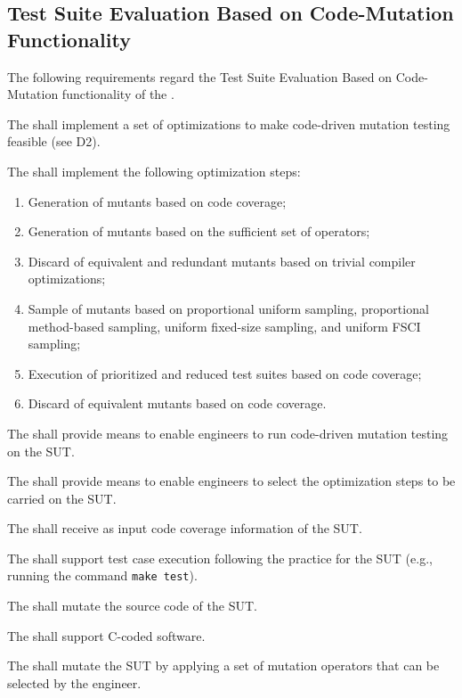 

\subsection{Test Suite Evaluation Based on Code-Mutation Functionality}
\label{sec:codeDriven}

The following requirements regard the Test Suite Evaluation Based on Code-Mutation functionality of the \FAQAS.

\RQ{} The \FAQAS shall implement a set of optimizations to make code-driven mutation testing feasible (see D2).

\RQ{} The \FAQAS shall implement the following optimization steps:
\begin{enumerate}
	\item Generation of mutants based on code coverage;
	\item Generation of mutants based on the sufficient set of operators;
	\item Discard of equivalent and redundant mutants based on trivial compiler optimizations;
	\item Sample of mutants based on proportional uniform sampling, proportional method-based sampling, uniform fixed-size sampling, and uniform FSCI sampling;
	\item Execution of prioritized and reduced test suites based on code coverage;
	\item Discard of equivalent mutants based on code coverage.
\end{enumerate}

\RQ{} The \FAQAS shall provide means to enable engineers to run code-driven mutation testing on the SUT.

\RQ{} The \FAQAS shall provide means to enable engineers to select the optimization steps to be carried on the SUT.

\RQ{} The \FAQAS shall receive as input code coverage information of the SUT.

\RQ{} The \FAQAS shall support test case execution following the practice for the SUT (e.g., running the command \texttt{make test}).

\RQ{} The \FAQAS shall mutate the source code of the SUT.

\RQ{} The \FAQAS shall support C-coded software.

\RQ{} The \FAQAS shall mutate the SUT by applying a set of mutation operators that can be selected by the engineer.

